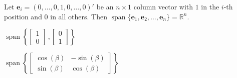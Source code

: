 \documentclass{article}
\DeclareMathOperator{\SPAN}{span}
\renewcommand{\vec}[1]{\mathbf{#1}}
\begin{document}
Let $\vec{e}_i = (0,\dots,0,1,0,\dots,0)'$ be an $n\times 1$ column 
vector with $1$ in the $i$-th position and $0$ in all others. Then 
$\SPAN\{\vec{e}_1,\vec{e}_2,\dots,\vec{e}_n\} = \mathbb{R}^n$.

$\SPAN \left\{
    \left[ \begin{array}{c}   
    1 \\
    0 
    \end{array} \right] \,,
    \left[ \begin{array}{c}   
    0 \\
    1 
    \end{array} \right]
\right\}$

$\SPAN \left\{
\begin{bmatrix}
\cos(\beta) & -\sin(\beta)\\
\sin(\beta) & \cos(\beta)
\end{bmatrix} 
\right\}$
\end{document}
